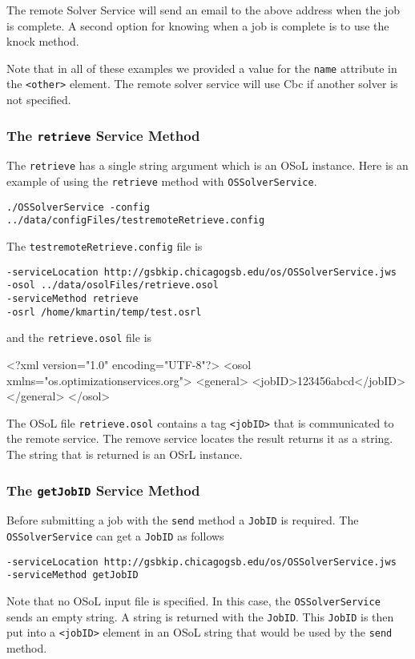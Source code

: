\documentclass[11pt]{article}
\renewcommand{\_}{{\char"5F}}
\renewcommand{\{}{{\char"7B}}
\renewcommand{\}}{{\char"7D}}
\renewcommand{\^}{{\char"0D}}
\renewcommand{\'}{{\char"0D}}
\begin{document}
The remote Solver Service will send an email to the above address when the job is complete. A second option for knowing when a job is complete is to use the knock method. 

Note that in all of these examples we provided a value for the {\tt name} attribute in the {\tt <other>} element. The remote solver service will use Cbc if another solver is not specified. 



\subsubsection{The  {\tt retrieve} Service Method}\label{section:retrieve}

The {\tt retrieve} has a single string argument which is an OSoL instance. Here is an example of using the {\tt retrieve} method with {\tt OSSolverService}.
\begin{verbatim}
./OSSolverService -config ../data/configFiles/testremoteRetrieve.config
\end{verbatim}
The {\tt testremoteRetrieve.config} file is
\begin{verbatim}
-serviceLocation http://gsbkip.chicagogsb.edu/os/OSSolverService.jws
-osol ../data/osolFiles/retrieve.osol
-serviceMethod retrieve
-osrl /home/kmartin/temp/test.osrl
\end{verbatim}
and the {\tt retrieve.osol} file is
\begin{verbatimtab}[4]
<?xml version="1.0" encoding="UTF-8"?>
<osol xmlns="os.optimizationservices.org">
 	<general>         
 		<jobID>123456abcd</jobID>  
	</general>
</osol>
\end{verbatimtab}
The OSoL file {\tt retrieve.osol} contains a tag {\tt <jobID>} that is communicated to the remote service. The remove service locates the result returns it as a string. The string that is returned is an OSrL instance. 

\subsubsection{The  {\tt getJobID} Service Method}\label{section:getjobid}

Before  submitting a job with the {\tt send} method a {\tt JobID} is required. The {\tt OSSolverService} can get a {\tt JobID} as follows
\begin{verbatim}
-serviceLocation http://gsbkip.chicagogsb.edu/os/OSSolverService.jws
-serviceMethod getJobID
\end{verbatim}
Note that no OSoL input file is specified. In this case, the {\tt OSSolverService} sends an empty string. A string is returned with the {\tt JobID}. This {\tt JobID} is then put into a {\tt <jobID>} element in an OSoL string that would be used by the {\tt send} method.
\end{document}
